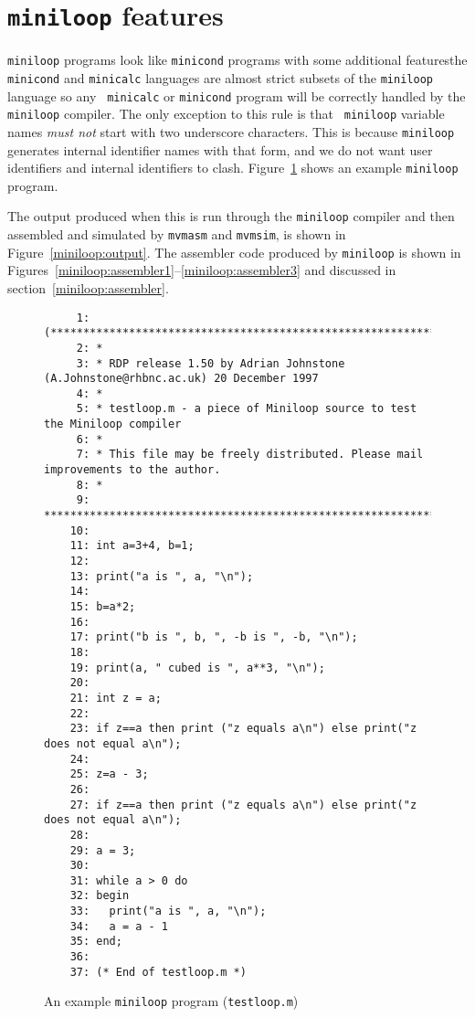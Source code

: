\section{{\tt miniloop} features}

{\tt miniloop} programs look like {\tt minicond} programs with some
additional features\dash the {\tt minicond} and {\tt minicalc} languages
are almost strict subsets of the {\tt miniloop} language so any {\tt
minicalc} or {\tt minicond} program will be correctly handled by the
{\tt miniloop} compiler. The only exception to this rule is that {\tt
miniloop} variable names {\em must not} start with two underscore
characters. This is because {\tt miniloop} generates  internal
identifier names with that form, and we do not want user identifiers and
internal identifiers to clash. Figure~\ref{miniloop:program} shows an
example {\tt miniloop} program. 

The output produced when this is run through the {\tt miniloop} compiler
and then assembled and simulated by {\tt mvmasm} and {\tt mvmsim}, is
shown in Figure~\ref{miniloop:output}. The assembler code produced by
{\tt miniloop} is shown in
Figures~\ref{miniloop:assembler1}--\ref{miniloop:assembler3} and
discussed in section~\ref{miniloop:assembler}.

\begin{figure}
\hspace*{-1cm}
\begin{minipage}{30cm}
\footnotesize
\begin{verbatim}
     1: (*******************************************************************************
     2: *
     3: * RDP release 1.50 by Adrian Johnstone (A.Johnstone@rhbnc.ac.uk) 20 December 1997
     4: *
     5: * testloop.m - a piece of Miniloop source to test the Miniloop compiler
     6: *
     7: * This file may be freely distributed. Please mail improvements to the author.
     8: *
     9: *******************************************************************************)
    10: 
    11: int a=3+4, b=1;
    12: 
    13: print("a is ", a, "\n");
    14: 
    15: b=a*2;
    16: 
    17: print("b is ", b, ", -b is ", -b, "\n");
    18: 
    19: print(a, " cubed is ", a**3, "\n");
    20: 
    21: int z = a;
    22: 
    23: if z==a then print ("z equals a\n") else print("z does not equal a\n");
    24: 
    25: z=a - 3;
    26: 
    27: if z==a then print ("z equals a\n") else print("z does not equal a\n");
    28: 
    29: a = 3;
    30: 
    31: while a > 0 do
    32: begin
    33:   print("a is ", a, "\n");
    34:   a = a - 1
    35: end;
    36: 
    37: (* End of testloop.m *)
\end{verbatim}
\end{minipage}
\caption{An example {\tt miniloop} program ({\tt testloop.m})}
\label{miniloop:program}
\end{figure}

